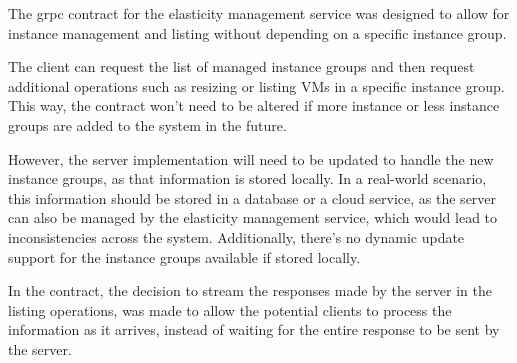 The grpc contract for the elasticity management service was designed
to allow for instance management and listing without depending on a specific instance group.

The client can request the list of managed instance groups and then request additional operations such as resizing or listing VMs in a specific instance group.
This way, the contract won't need to be altered if more instance or less instance groups are added to the system in the future.

However, the server implementation will need to be updated to handle the new instance groups,
as that information is stored locally.
In a real-world scenario, this information should be stored in a database or a cloud service, as the server can also be managed by the elasticity management service,
which would lead to inconsistencies across the system.
Additionally, there's no dynamic update support for the instance groups available if stored locally.

In the contract, the decision to stream the responses made by the server in the listing operations,
was made to allow the potential clients to process the information as it arrives,
instead of waiting for the entire response to be sent by the server.
